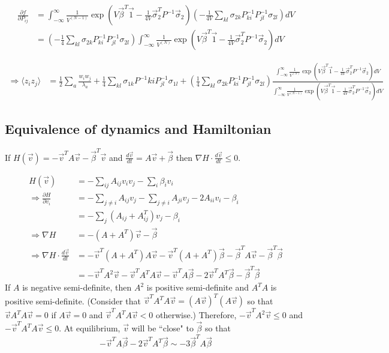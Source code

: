 \documentclass{article}
\begin{document}
\begin{align*}
\frac{\partial f}{\partial P_{ij}}&=\int_{-\infty}^\infty\frac{1}{V^{(N-1)}}\exp\left(V\vec{\beta}^T\vec{1}-\frac{1}{4V}\vec{\sigma}_2^TP^{-1}\vec{\sigma}_2\right)\left(-\frac{1}{4V}\sum_{kl}\sigma_{2k}P^{-1}_{ki}P^{-1}_{jl}\sigma_{2l}\right)dV
\\&=\left(-\frac{1}{4}\sum_{kl}\sigma_{2k}P^{-1}_{ki}P^{-1}_{jl}\sigma_{2l}\right)\int_{-\infty}^\infty\frac{1}{V^{(N)}}\exp\left(V\vec{\beta}^T\vec{1}-\frac{1}{4V}\vec{\sigma}_2^TP^{-1}\vec{\sigma}_2\right)dV
\end{align*}

\small{
\begin{align*}
\Rightarrow\langle z_iz_j\rangle &=\frac{1}{2}\sum_a\frac{w_iw_j}{\lambda_a}+\frac{1}{4}\sum_{kl}\sigma_{1k}P^{-1}{ki}P^{-1}_{jl}\sigma_{1l}+\left(\frac{1}{4}\sum_{kl}\sigma_{2k}P^{-1}_{ki}P^{-1}_{jl}\sigma_{2l}\right)\frac{\int_{-\infty}^\infty\frac{1}{V^{(N)}}\exp\left(V\vec{\beta}^T\vec{1}-\frac{1}{4V}\vec{\sigma}_2^TP^{-1}\vec{\sigma}_2\right)dV}{\int_{-\infty}^\infty\frac{1}{V^{(N-1)}}\exp\left(V\vec{\beta}^T\vec{1}-\frac{1}{4V}\vec{\sigma}_2^TP^{-1}\vec{\sigma}_2\right)dV}
\end{align*}}


\subsection{Equivalence of dynamics and Hamiltonian }
\begin{claim}
If $H(\vec{v})=-\vec{v}^TA\vec{v}-\vec{\beta}^T\vec{v}$ and $\frac{d\vec{v}}{dt}=A\vec{v}+\vec{\beta}$ then $\nabla H\cdot \frac{d\vec{v}}{dt}\leq 0$.
\end{claim}
\begin{pf}
\begin{align*}
H(\vec{v})&=-\sum_{ij}A_{ij}v_iv_j-\sum_i\beta_iv_i
\\\Rightarrow\frac{\partial H}{\partial v_i}&=-\sum_{j\neq i}A_{ij}v_j-\sum_{j\neq i}A_{ji}v_j-2A_{ii}v_i-\beta_i
\\&=-\sum_j(A_{ij}+A^T_{ij})v_j-\beta_i
\\ \Rightarrow \nabla H&=-(A+A^T)\vec{v}-\vec{\beta}
\\ \Rightarrow \nabla H\cdot \frac{d\vec{v}}{dt}&=-\vec{v}^T(A+A^T)A\vec{v}-\vec{v}^T(A+A^T)\vec{\beta}-\vec{\beta}^TA\vec{v}-\vec{\beta}^T\vec{\beta}
\\&=-\vec{v}^TA^2\vec{v}-\vec{v}^TA^TA\vec{v}-\vec{v}^TA\vec{\beta}-2\vec{v}^TA^T\vec{\beta}-\vec{\beta}^T\vec{\beta}
\end{align*}
If $A$ is negative semi-definite, then $A^2$ is positive semi-definite and $A^TA$ is positive semi-definite.  (Consider that $\vec{v}^TA^TA\vec{v}=(A\vec{v})^T(A\vec{v})$ so that $\vec{v}A^TA\vec{v}=0$ if $A\vec{v}=0$ and $\vec{v}^TA^TA\vec{v}<0$ otherwise.) Therefore, $-\vec{v}^TA^2\vec{v}\leq 0$ and $-\vec{v}^TA^TA\vec{v}\leq 0$. At equilibrium, $\vec{v}$ will be ``close" to $\vec{\beta}$ so that $$-\vec{v}^TA\vec{\beta}-2\vec{v}^TA^T\vec{\beta}\sim-3\vec{\beta}^TA\vec{\beta}$$
\end{pf}
\end{document}
